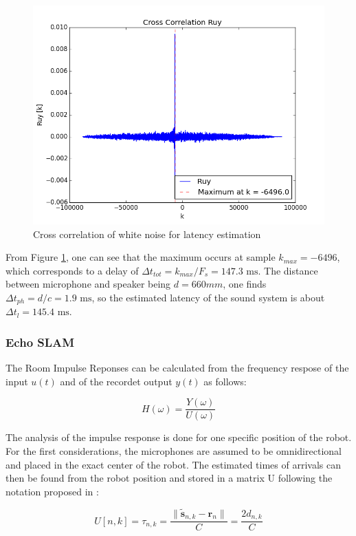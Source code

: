 \begin{figure}[H]
	\centering
	\includegraphics[width=0.8\linewidth]{files/audio_ruy.png}
	\caption{Cross correlation of white noise for latency estimation}
	\label{fig:audio_ruy}
\end{figure}

From Figure \ref{fig:audio_ruy}, one can see that the maximum occurs at sample $k_{max}=-6496$, which corresponds to a delay of $\Delta t_{tot}=k_{max}/F_s=147.3 \text{ ms}$. The distance between microphone and speaker being $d=660mm$, one finds $\Delta t_{ph} = d/c=1.9  \text{ ms}$, so the estimated latency of the sound system is about $\Delta t_{l}=145.4 \text{ ms}$.

\subsubsection{Echo SLAM}

The Room Impulse Reponses can be calculated from the frequency respose of the input $u(t)$ and of the recordet output $y(t)$ as follows:

\begin{equation}
    H(\omega) = \frac{Y(\omega)}{U(\omega)}
    \label{eq:impulse}
\end{equation}

The analysis of the impulse response is done for one specific position of the robot. For the first considerations, the microphones are assumed to be omnidirectional and placed in the exact center of the robot. 
The estimated times of arrivals can then be found from the robot position and stored in a matrix U following the notation proposed in \cite{Miranda}:

\begin{equation}
    U[n,k]=\tau_{n,k}=\frac{\| \tilde{\mathbf{s}}_{n,k}-\mathbf{r}_{n} \|}{C}=\frac{2d_{n,k}}{C}
    \label{eq:TOA}
\end{equation}

